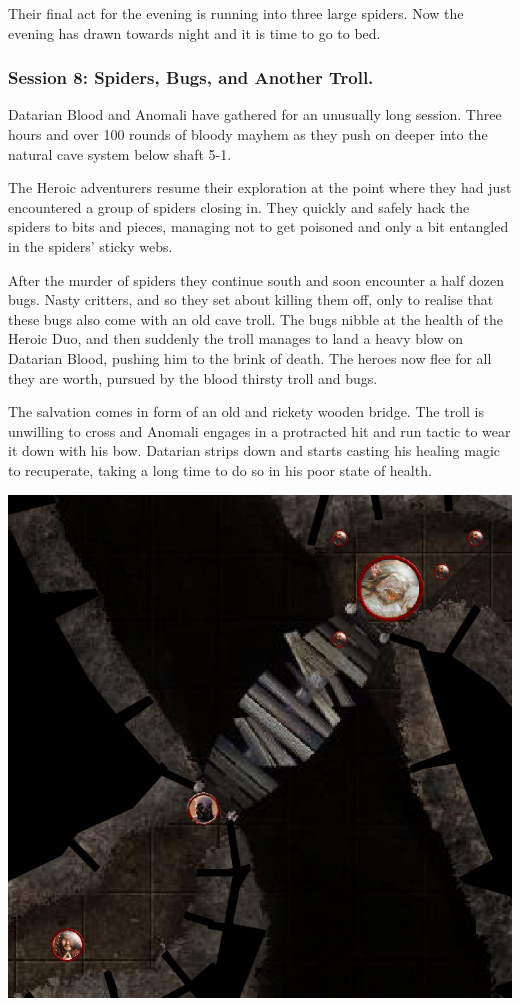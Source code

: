 Their final act for the evening is running into three large spiders. Now the evening has drawn towards night and it is time to go to bed.


\subsubsection*{Session 8: Spiders, Bugs, and Another Troll.}
Datarian Blood and Anomali have gathered for an unusually long session. Three hours and over 100 rounds of bloody mayhem as they push on deeper into the natural cave system below shaft 5-1.

The Heroic adventurers resume their exploration at the point where they had just encountered a group of spiders closing in. They quickly and safely hack the spiders to bits and pieces, managing not to get poisoned and only a bit entangled in the spiders' sticky webs.

After the murder of spiders they continue south and soon encounter a half dozen bugs. Nasty critters, and so they set about killing them off, only to realise that these bugs also come with an old cave troll. The bugs nibble at the health of the Heroic Duo, and then suddenly the troll manages to land a heavy blow on Datarian Blood, pushing him to the brink of death. The heroes now flee for all they are worth, pursued by the blood thirsty troll and bugs.

The salvation comes in form of an old and rickety wooden bridge. The troll is unwilling to cross and Anomali engages in a protracted hit and run tactic to wear it down with his bow. Datarian strips down and starts casting his healing magic to recuperate, taking a long time to do so in his poor state of health.

\begin{center}
\vspace{0.5 cm}
\includegraphics[width=0.7\linewidth]{./figs/playthrough/bridge-troll.png}
\vspace{0.5 cm}
\end{center}

